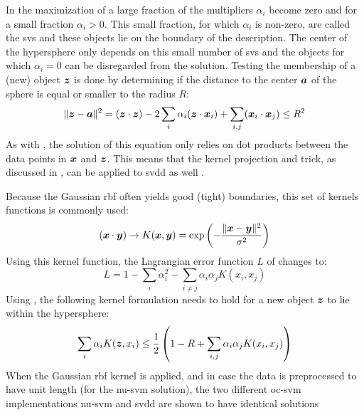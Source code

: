 In the maximization of  a large fraction of the multipliers $\alpha_i$ become zero and for a small fraction $\alpha_i > 0$.
This small fraction, for which $\alpha_i$ is non-zero, are called the \glspl{sv} and these objects lie on the boundary of the description.
The center of the hypersphere only depends on this small number of \glspl{sv} and the objects for which $\alpha_i = 0$ can be disregarded from the solution.
Testing the membership of a (new) object $\vectorsym{z}$ is done by determining if the distance to the center $\vectorsym{a}$ of the sphere is equal or smaller to the radius $R$:
\begin{equation}\label{eq:svdd_test_object}
  \lVert \vectorsym{z} - \vectorsym{a} \rVert ^2 = (\vectorsym{z} \cdot \vectorsym{z}) - 2 \sum_{i} \alpha_i(\vectorsym{z} \cdot \vectorsym{x}_i) + \sum_{i,j}(\vectorsym{x}_i \cdot \vectorsym{x}_j) \le R^2
\end{equation}
As with , the solution of this equation only relies on dot products between the data points in $\vectorsym{x}$ and $\vectorsym{z}$.
This means that the kernel projection and trick, as discussed in , can be applied to \gls{svdd} as well \cite{tax1999support,tax2002uniform}.

Because the Gaussian \gls{rbf} often yields good (\ie tight) boundaries, this set of kernels functions is commonly used:
\begin{equation}
  (\vectorsym{x} \cdot \vectorsym{y}) \rightarrow K(\vectorsym{x},\vectorsym{y}) = \operatorname{exp}\left(- \frac{\lVert \vectorsym{x} - \vectorsym{y} \rVert ^2}{\sigma^2}\right)
\end{equation}
Using this kernel function, the Lagrangian error function $L$ of  changes to:
\begin{equation}\label{eq:svdd_lagrange_kernel}
  L = 1 - \sum_{i} \alpha_i^2 - \sum_{i \ne j} \alpha_i \alpha_j K(x_i, x_j)
\end{equation}
Using , the following kernel formulation needs to hold for a new object $\vectorsym{z}$ to lie within the hypersphere:
\begin{equation}\label{eq:svdd_inequality}
  \sum_{i} \alpha_i K(\vectorsym{z}, x_i) \le \frac{1}{2} \left( 1 - R + \sum_{i,j} \alpha_i \alpha_j K(x_i, x_j) \right)
\end{equation}
When the Gaussian \gls{rbf} kernel is applied, and in case the data is preprocessed to have unit length (for the \gls{nu-svm} solution), the two different \gls{oc-svm} implementations \gls{nu-svm} and \gls{svdd} are shown to have identical solutions \cite{tax2002uniform,scholkopf2002learning}

